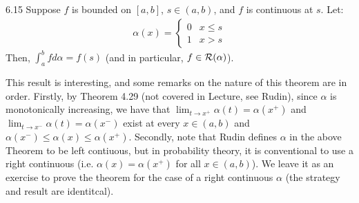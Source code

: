 \setcounter{rudin}{14}

\begin{theorem}{}{6.15}
    Suppose $f$ is bounded on $[a, b]$, $s \in (a, b)$, and $f$ is continuous at $s$. Let:
    \begin{align*}
        \alpha(x) = \begin{cases}
            0 & x \leq s
            \\ 1 & x > s
        \end{cases}
    \end{align*}
    Then, $\int_a^b fd\alpha = f(s)$ (and in particular, $f \in \mathcal{R}(\alpha)$).
\end{theorem}

\noindent This result is interesting, and some remarks on the nature of this theorem are in order. Firstly, by Theorem 4.29 (not covered in Lecture, see Rudin), since $\alpha$ is monotonically increasing, we have that $\lim_{t \rightarrow x^+}\alpha(t) = \alpha(x^+)$ and $\lim_{t \rightarrow x^-}\alpha(t) = \alpha(x^-)$ exist at every $x \in (a, b)$ and $\alpha(x^-) \leq \alpha(x) \leq \alpha(x^+)$. Secondly, note that Rudin defines $\alpha$ in the above Theorem to be left contiuous, but in probability theory, it is conventional to use a right continuous (i.e. $\alpha(x) = \alpha(x^+)$ for all $x \in (a, b)$). We leave it as an exercise to prove the theorem for the case of a right continuous $\alpha$ (the strategy and result are identitcal).

